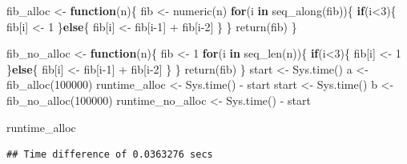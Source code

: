 \documentclass[
]{book}
\newenvironment{Shaded}{\begin{snugshade}}{\end{snugshade}}
\newcommand{\ControlFlowTok}[1]{\textcolor[rgb]{0.13,0.29,0.53}{\textbf{#1}}}
\newcommand{\DecValTok}[1]{\textcolor[rgb]{0.00,0.00,0.81}{#1}}
\newcommand{\FunctionTok}[1]{\textcolor[rgb]{0.00,0.00,0.00}{#1}}
\newcommand{\NormalTok}[1]{#1}
\newcommand{\OtherTok}[1]{\textcolor[rgb]{0.56,0.35,0.01}{#1}}
\newcommand{\SpecialCharTok}[1]{\textcolor[rgb]{0.00,0.00,0.00}{#1}}
\begin{document}
\begin{Shaded}
\begin{Highlighting}[]
\NormalTok{fib\_alloc }\OtherTok{\textless{}{-}} \ControlFlowTok{function}\NormalTok{(n)\{}
\NormalTok{  fib }\OtherTok{\textless{}{-}} \FunctionTok{numeric}\NormalTok{(n)}
  \ControlFlowTok{for}\NormalTok{(i }\ControlFlowTok{in} \FunctionTok{seq\_along}\NormalTok{(fib))\{}
    \ControlFlowTok{if}\NormalTok{(i}\SpecialCharTok{\textless{}}\DecValTok{3}\NormalTok{)\{ }
\NormalTok{      fib[i] }\OtherTok{\textless{}{-}} \DecValTok{1}
\NormalTok{    \}}\ControlFlowTok{else}\NormalTok{\{}
\NormalTok{      fib[i] }\OtherTok{\textless{}{-}}\NormalTok{ fib[i}\DecValTok{{-}1}\NormalTok{] }\SpecialCharTok{+}\NormalTok{ fib[i}\DecValTok{{-}2}\NormalTok{] }
\NormalTok{    \}}
\NormalTok{  \}}
  \FunctionTok{return}\NormalTok{(fib)}
\NormalTok{\}}


\NormalTok{fib\_no\_alloc }\OtherTok{\textless{}{-}} \ControlFlowTok{function}\NormalTok{(n)\{}
\NormalTok{  fib }\OtherTok{\textless{}{-}} \DecValTok{1}
  \ControlFlowTok{for}\NormalTok{(i }\ControlFlowTok{in} \FunctionTok{seq\_len}\NormalTok{(n))\{}
    \ControlFlowTok{if}\NormalTok{(i}\SpecialCharTok{\textless{}}\DecValTok{3}\NormalTok{)\{ }
\NormalTok{      fib[i] }\OtherTok{\textless{}{-}} \DecValTok{1}
\NormalTok{    \}}\ControlFlowTok{else}\NormalTok{\{}
\NormalTok{      fib[i] }\OtherTok{\textless{}{-}}\NormalTok{ fib[i}\DecValTok{{-}1}\NormalTok{] }\SpecialCharTok{+}\NormalTok{ fib[i}\DecValTok{{-}2}\NormalTok{] }
\NormalTok{    \}}
\NormalTok{  \}}
  \FunctionTok{return}\NormalTok{(fib)}
\NormalTok{\}}
\NormalTok{start }\OtherTok{\textless{}{-}} \FunctionTok{Sys.time}\NormalTok{()}
\NormalTok{a }\OtherTok{\textless{}{-}} \FunctionTok{fib\_alloc}\NormalTok{(}\DecValTok{100000}\NormalTok{)}
\NormalTok{runtime\_alloc }\OtherTok{\textless{}{-}} \FunctionTok{Sys.time}\NormalTok{() }\SpecialCharTok{{-}}\NormalTok{ start}
\NormalTok{start }\OtherTok{\textless{}{-}} \FunctionTok{Sys.time}\NormalTok{()}
\NormalTok{b }\OtherTok{\textless{}{-}} \FunctionTok{fib\_no\_alloc}\NormalTok{(}\DecValTok{100000}\NormalTok{)}
\NormalTok{runtime\_no\_alloc }\OtherTok{\textless{}{-}} \FunctionTok{Sys.time}\NormalTok{() }\SpecialCharTok{{-}}\NormalTok{ start}

\NormalTok{runtime\_alloc}
\end{Highlighting}
\end{Shaded}

\begin{verbatim}
## Time difference of 0.0363276 secs
\end{verbatim}
\end{document}
